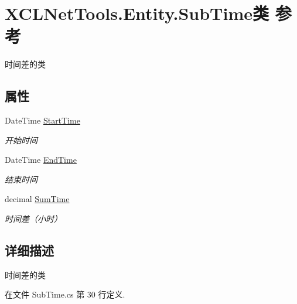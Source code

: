 \hypertarget{class_x_c_l_net_tools_1_1_entity_1_1_sub_time}{\section{X\-C\-L\-Net\-Tools.\-Entity.\-Sub\-Time类 参考}
\label{class_x_c_l_net_tools_1_1_entity_1_1_sub_time}
}


时间差的类  


\subsection*{属性}
\begin{DoxyCompactItemize}
\item 
Date\-Time \hyperlink{class_x_c_l_net_tools_1_1_entity_1_1_sub_time_a7813c7a0874535abbe0b5307d7310c27}{Start\-Time}
\begin{DoxyCompactList}\small\item\em 开始时间 \end{DoxyCompactList}\item 
Date\-Time \hyperlink{class_x_c_l_net_tools_1_1_entity_1_1_sub_time_a286d907d4beb9e6153f1abdb6f2c95fd}{End\-Time}
\begin{DoxyCompactList}\small\item\em 结束时间 \end{DoxyCompactList}\item 
decimal \hyperlink{class_x_c_l_net_tools_1_1_entity_1_1_sub_time_afe5aa74e0038c4b4342be84211c3f607}{Sum\-Time}
\begin{DoxyCompactList}\small\item\em 时间差（小时） \end{DoxyCompactList}\end{DoxyCompactItemize}


\subsection{详细描述}
时间差的类 



在文件 Sub\-Time.\-cs 第 30 行定义.



